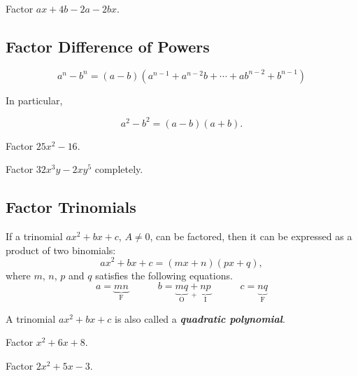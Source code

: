 \begin{example}
  Factor \(ax+4b-2a-2bx\).
\end{example}
\vspace*{4\baselineskip}

\hypertarget{factor-difference-of-powers}{%
\subsection{Factor Difference of
Powers}\label{factor-difference-of-powers}}

\[a^n-b^n=(a-b)(a^{n-1}+a^{n-2}b+\cdots +ab^{n-2}+b^{n-1})\]

In particular,

\[a^2-b^2=(a-b)(a+b).\]

\begin{example}
  Factor \(25x^2-16\).
\end{example}
\vspace*{4\baselineskip}

\begin{example}
  Factor \(32x^3y-2xy^5\) completely.
\end{example}
\vspace*{4\baselineskip}

\hypertarget{factor-trinomials}{%
\subsection{Factor Trinomials}\label{factor-trinomials}}

If a trinomial \(ax^2+bx+c\), \(A\neq 0\), can be factored, then it can
be expressed as a product of two binomials:\\
\[ax^2+bx+c=(mx+n)(px+q),\] where $m$, $n$, $p$ and $q$ satisfies the following equations.
\[
a=\underbrace{mn}_{\mathrm{F}}\quad\quad\quad
b=\underbrace{mq}_{\mathrm{O}}~\underset{+}{\underset{}{+}}~\underbrace{np}_{\mathrm{I}}
\quad\quad\quad
c=\underbrace{nq}_{\mathrm{F}}
\]

A trinomial \(ax^2+bx+c\) is also called a \textbf{\emph{quadratic
polynomial}}.

\begin{example}
  Factor \(x^2+6x+8\).
\end{example}
\vspace*{4\baselineskip}

\begin{example}
  Factor \(2x^2+5x-3\).
\end{example}
\vspace*{4\baselineskip}

